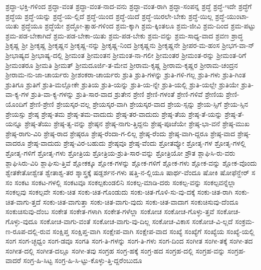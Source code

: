 {ಶ್ರದ್ಧಾ-ಭಕ್ತಿ-ಗಳಿಂದ
ಶ್ರದ್ಧಾ-ವಂತ
ಶ್ರದ್ಧಾ-ವಂತ-ನಾದ-ವನು
ಶ್ರದ್ಧಾ-ವಂತ-ರಾಗಿ
ಶ್ರದ್ಧಾ-ಸಂಪನ್ನ
ಶ್ರದ್ಧೆ
ಶ್ರದ್ಧೆ-ಇದೇ
ಶ್ರದ್ಧೆಗೆ
ಶ್ರದ್ಧೆಯ
ಶ್ರದ್ಧೆ-ಯನ್ನು
ಶ್ರದ್ಧೆ-ಯ-ಲ್ಲಿದೆ
ಶ್ರದ್ಧೆ-ಯಿಂದ
ಶ್ರದ್ಧೆ-ಯಿದೆ
ಶ್ರದ್ಧೆ-ಯಿರಲೇ-ಬೇಕು
ಶ್ರದ್ಧೆ-ಯಿಲ್ಲ
ಶ್ರದ್ಧೆ-ಯುಂಟಾ-ಯಿತು
ಶ್ರದ್ಧೆಯೂ
ಶ್ರದ್ಧೆಯೇ
ಶ್ರದ್ಧೋ-ತ್ಸಾಹ-ಗಳಿಂದ
ಶ್ರಮ-ಕ್ಕಾಗಿ
ಶ್ರಮ-ಕ್ಕಿಂತಲೂ
ಶ್ರಮ-ಜೀವಿ
ಶ್ರಮ-ದಿಂದ
ಶ್ರಮ-ಪಟ್ಟು
ಶ್ರಮ-ಪಡ-ಬೇಕಾಗಿದೆ
ಶ್ರಮ-ಪಡ-ಬೇಕಾ-ಯಿತು
ಶ್ರಮ-ಪಡ-ಬೇಕು
ಶ್ರಮ-ವನ್ನು
ಶ್ರಮ-ಸಾಧ್ಯ-ವಾದ
ಶ್ರವಣ
ಶ್ರಾದ್ಧ
ಶ್ರಿಕೃಷ್ಣ
ಶ್ರೀ
ಶ್ರೀಕೃಷ್ಣ
ಶ್ರೀಕೃಷ್ಣನ
ಶ್ರೀಕೃಷ್ಣ-ನನ್ನು
ಶ್ರೀಕೃಷ್ಣ-ನಿಂದ
ಶ್ರೀಕೃಷ್ಣನು
ಶ್ರೀಕೃಷ್ಣನೇ
ಶ್ರೀಪರ-ಮ-ಹಂಸ
ಶ್ರೀಭಗ-ವಾ-ನ್
ಶ್ರೀಭಾಷ್ಯದ
ಶ್ರೀಭಾಷ್ಯ-ದಲ್ಲಿ
ಶ್ರೀಮಂತ
ಶ್ರೀಮಂತನ
ಶ್ರೀಮಂತ-ನಾ-ಗಲೀ
ಶ್ರೀಮಂತರ
ಶ್ರೀಮಂತ-ರನ್ನು
ಶ್ರೀಮಂತ-ರಿಗೆ
ಶ್ರೀಮಂತರೂ
ಶ್ರೀಮತಿ
ಶ್ರೀಮತ್
ಶ್ರೀಮದೂರ್ಜಿ-ತ-ಮೇವ
ಶ್ರೀರಾಮ-ಕೃಷ್ಣ
ಶ್ರೀರಾಮ-ಕೃಷ್ಣರ
ಶ್ರೀರಾಮ-ಚಂದ್ರನ
ಶ್ರೀರಾಮ-ನು-ಜಾ-ಚಾರ್ಯರು
ಶ್ರೀಶಂಕರಾ-ಚಾರ್ಯರು
ಶ್ರುತಿ
ಶ್ರುತಿ-ಗಳನ್ನು
ಶ್ರುತಿ-ಗಳಿ-ಗಲ್ಲ
ಶ್ರುತಿ-ಗಳು
ಶ್ರುತಿ-ಗಿಂತ
ಶ್ರುತಿಗೂ
ಶ್ರುತಿಗೆ
ಶ್ರುತಿ-ಮಲ್ಲೋಕೇ
ಶ್ರುತಿಯ
ಶ್ರುತಿ-ಯನ್ನು
ಶ್ರುತಿ-ಯ-ನ್ನೇ
ಶ್ರುತಿ-ಯಲ್ಲಿ
ಶ್ರುತಿ-ಯಲ್ಲೇ
ಶ್ರುತಿಯೇ
ಶ್ರುತಿ-ವಾ-ಕ್ಯ-ಗಳ
ಶ್ರುತಿ-ವಾ-ಕ್ಯ-ಗಳನ್ನು
ಶ್ರುತಿ-ಸಾರ-ವಾದ
ಶ್ರುತೇನ
ಶ್ರೇಣಿ
ಶ್ರೇಣಿ-ಗಳಂತೆ
ಶ್ರೇಣಿ-ಗಳಿವೆ
ಶ್ರೇಣಿಯ
ಶ್ರೇಣಿ-ಯೊಂದಿಗೆ
ಶ್ರೇಣಿ-ಶ್ರೇಣಿ
ಶ್ರೇಯಸ್ಕರ-ವಲ್ಲ
ಶ್ರೇಯಸ್ಕರ-ವಾಗಿ
ಶ್ರೇಯಸ್ಕರ-ವಾದ
ಶ್ರೇಯ-ಸ್ಸನ್ನು
ಶ್ರೇಯ-ಸ್ಸಿಗೆ
ಶ್ರೇಯ-ಸ್ಸಿನ
ಶ್ರೇಯಸ್ಸು
ಶ್ರೇಷ್ಠ
ಶ್ರೇಷ್ಠ-ತಮ
ಶ್ರೇಷ್ಠ-ತಮ-ವಾದುದು
ಶ್ರೇಷ್ಠ-ತರ-ವಾದುದು
ಶ್ರೇಷ್ಠ-ತೆಯ
ಶ್ರೇಷ್ಠ-ತೆ-ಯನ್ನು
ಶ್ರೇಷ್ಠ-ತೆ-ಯನ್ನೂ
ಶ್ರೇಷ್ಠ-ತೆಯು
ಶ್ರೇಷ್ಠ-ತ್ವ-ವನ್ನು
ಶ್ರೇಷ್ಠನ
ಶ್ರೇಷ್ಠ-ನಾಗು-ತ್ತಿದ್ದನು
ಶ್ರೇಷ್ಠ-ಪೂಜೆಯೇ
ಶ್ರೇಷ್ಠ-ಭಾ-ವನೆ
ಶ್ರೇಷ್ಠ-ಮುಖ
ಶ್ರೇಷ್ಠ-ರಾಗು-ವಿರಿ
ಶ್ರೇಷ್ಠ-ರಾದ
ಶ್ರೇಷ್ಠರೂ
ಶ್ರೇಷ್ಠ-ರೆಂದಾ-ಗ-ಲಿಲ್ಲ
ಶ್ರೇಷ್ಠ-ರೆಂದು
ಶ್ರೇಷ್ಠ-ವಾಗಿ-ದ್ದರೂ
ಶ್ರೇಷ್ಠ-ವಾದ
ಶ್ರೇಷ್ಠ-ವಾದರೂ
ಶ್ರೇಷ್ಠ-ವಾದುದು
ಶ್ರೇಷ್ಠ-ವಿರ-ಬಹುದು
ಶ್ರೇಷ್ಠವೂ
ಶ್ರೇಷ್ಠ-ವೆಂದು
ಶ್ರೋತವ್ಯೋ
ಶ್ರೋತೃ-ಗಳ
ಶ್ರೋತೃ-ಗಳಲ್ಲಿ
ಶ್ರೋತೃ-ಗಳಿಗೆ
ಶ್ರೋತೃ-ಗಳು
ಶ್ರೋತ್ರಿಯ
ಶ್ರೋತ್ರಿಯ-ಶ್ರುತಿ-ಸಾರ-ವನ್ನು
ಶ್ರೋತ್ರಿಯೋ
ಶ್ರೌತ
ಶ್ಲಾಘಿಸಿ-ರು-ವರು
ಶ್ಲಾಘಿಸಿರು-ವಿರಿ
ಶ್ಲಾಘಿಸು-ತ್ತಿವೆ
ಶ್ಲೋಕಕ್ಕೂ
ಶ್ಲೋಕ-ಗಳನ್ನು
ಶ್ಲೋಕ-ಗಳಿಗೆ
ಶ್ಲೋಕ-ಗಳು
ಶ್ಲೋಕ-ವನ್ನು
ಶ್ಲೋಕ-ವೊಂದು
ಶ್ವೇತಕೇತೋಶ್ವೇತ
ಶ್ವೇತಾಶ್ವ-ತರ
ಶ್ಶಾಸ್ತ್ರಕ್ಕೆ
ಷಡ್ದರ್ಶನ-ಗಳು
ಷತ್ತಿ-ನ-ಲ್ಲಿಯೂ
ಷಾರ್ಥ-ವೆಂದೂ
ಷೋಕಿ
ಷೋಫೆನ್ಹೇರ್
ಸ
ಸಂ
ಸಂಕಟ
ಸಂಕಟ-ಗಳಲ್ಲಿ
ಸಂಕಟವೂ
ಸಂಕಲ್ಪಕುಂಡಲಿನಿ
ಸಂಕಲ್ಪ-ಮಾಡಿ-ದರು
ಸಂಕಲ್ಪ-ವನ್ನು
ಸಂಕಲ್ಪವನ್ನೆಲ್ಲಾ
ಸಂಕಲ್ಪವು
ಸಂಕಲ್ಪವೇ
ಸಂಕು-ಚಿತ
ಸಂಕು-ಚಿತ-ಗೊಂಡುದು
ಸಂಕು-ಚಿತ-ಗೊಳಿ-ಸು-ವು-ದಕ್ಕೆ
ಸಂಕು-ಚಿತ-ರಾಗಿ
ಸಂಕು-ಚಿತ-ವಾಗು-ತ್ತದೆ
ಸಂಕು-ಚಿತ-ವಾಗುತ್ತಾ
ಸಂಕು-ಚಿತ-ವಾಗು-ವುದು
ಸಂಕು-ಚಿತ-ವಾದಾಗ
ಸಂಕುಚಿಸುವು-ದೆಂದೂ
ಸಂಕುಚಿಸುವು-ದೆಂಬ
ಸಂಕೇತ
ಸಂಕೇತ-ಗಳಾಗಿ
ಸಂಕೇತ-ಗಳೆಲ್ಲಾ
ಸಂಕೋಚ
ಸಂಕೋಚ-ಗೊಳ್ಳು-ತ್ತವೆ
ಸಂಕೋಚ-ಗೊಳ್ಳು-ವುದೂ
ಸಂಕೋಚ-ವಾಗು-ವಂತೆ
ಸಂಕೋಚ-ವಾಗು-ವು-ದಿಲ್ಲ
ಸಂಕೋಚ-ವಿಕಾಸ
ಸಂಕೋಚ-ವಿ-ಲ್ಲದೆ
ಸಂಕ್ರಮ-ಣ-ರೂಪ-ದಲ್ಲಿ-ರುವ
ಸಂಕ್ಷಿಪ್ತ
ಸಂಕ್ಷಿಪ್ತ-ವಾಗಿ
ಸಂಕ್ಷೇಪ-ವಾಗಿ
ಸಂಕ್ಷೇಪ-ವಾದ
ಸಂಖ್ಯೆ
ಸಂಖ್ಯೆಗೆ
ಸಂಖ್ಯೆಯ
ಸಂಖ್ಯೆ-ಯಲ್ಲಿ
ಸಂಗ
ಸಂಗ-ಚ್ಛಧ್ವಂ
ಸಂಗ-ಡವೂ
ಸಂಗತಿ
ಸಂಗ-ತಿ-ಗಳನ್ನು
ಸಂಗ-ತಿ-ಗಳು
ಸಂಗ-ದಿಂದ
ಸಂಗೀತ
ಸಂಗೀ-ತಕ್ಕೆ
ಸಂಗೀ-ತದ
ಸಂಗೀತ-ದಲ್ಲಿ
ಸಂಗೀತ-ದಲ್ಲೂ
ಸಂಗೀ-ತವು
ಸಂಗ್ರಹ
ಸಂಗ್ರ-ಹಕ್ಕೆ
ಸಂಗ್ರ-ಹದ
ಸಂಗ್ರಹ-ದಲ್ಲಿ
ಸಂಗ್ರಹ-ವನ್ನು
ಸಂಗ್ರಹ-ವಾದರೆ
ಸಂಗ್ರ-ಹಿ-ಸಿಟ್ಟ
ಸಂಗ್ರ-ಹಿ-ಸಿ-ಟ್ಟು-ಕೊಳ್ಳು-ತ್ತಿ-ದ್ದರೆಂಬುದೂ
}
